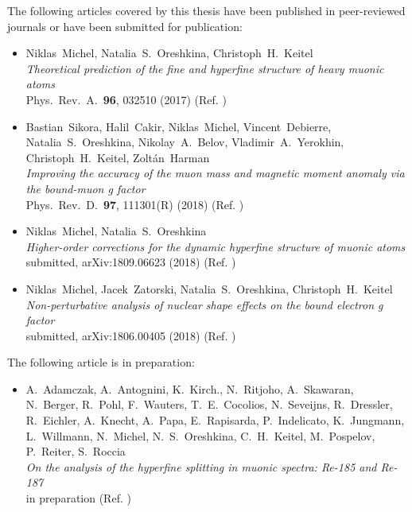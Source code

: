 \ifthispageodd{}{\cleardoublepage}


\noindent \normalfont
The following articles covered by this thesis have been published in peer-reviewed \\journals or have been submitted for publication:

\begin{itemize}
\item Niklas~Michel, Natalia~S.~Oreshkina, Christoph~H.~Keitel \\ 
\textit{Theoretical prediction of the fine and hyperfine structure of heavy muonic atoms} \\ 
Phys.~Rev.~A.~\textbf{96}, 032510 (2017) (Ref. \cite{michel2017})\vspace*{1pt}
%
\item Bastian~Sikora, Halil~Cakir, Niklas~Michel, Vincent~Debierre, Natalia~S.~Oreshkina, Nikolay~A.~Belov, Vladimir~A.~Yerokhin, Christoph~H.~Keitel, Zoltán~Harman \\ 
\textit{Improving the accuracy of the muon mass and magnetic moment anomaly via the bound-muon g factor} \\ 
Phys.~Rev.~D.~\textbf{97}, 111301(R) (2018) (Ref. \cite{sikora2018}) \vspace*{1pt}
\item Niklas~Michel, Natalia~S.~Oreshkina \\ 
\textit{Higher-order corrections for the dynamic hyperfine structure of muonic atoms}\\
submitted, arXiv:1809.06623 (2018) (Ref. \cite{michel_muonHO}) \vspace*{1pt}
\item Niklas~Michel, Jacek~Zatorski, Natalia~S.~Oreshkina, Christoph~H.~Keitel \\ 
\textit{Non-perturbative analysis of nuclear shape effects on the bound electron g factor}\\
submitted, arXiv:1806.00405 (2018) (Ref. \cite{michel_nuclDef}) \vspace*{1pt}\\
\end{itemize} 

\noindent
The following article is in preparation:

\begin{itemize}
\item A.~Adamczak, A.~Antognini, K.~Kirch., N.~Ritjoho, A.~Skawaran, N.~Berger, R.~Pohl, F.~Wauters, T.~E.~Cocolios, N.~Seveijns, R.~Dressler, R.~Eichler, A.~Knecht, A.~Papa, E.~Rapisarda, P.~Indelicato, K.~Jungmann, L.~Willmann, N.~Michel, N.~S.~Oreshkina, C.~H.~Keitel, M.~Pospelov, P.~Reiter, S.~Roccia\\ 
\textit{On the analysis of the hyperfine splitting in muonic spectra:
Re-185 and Re-187} \\ 
in preparation (Ref. \cite{psiReDraft}) \vspace*{1pt} \\
\end{itemize} 

